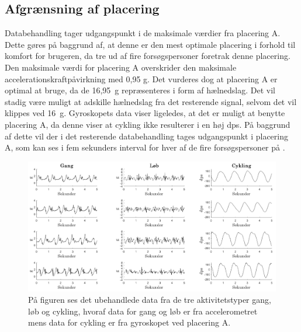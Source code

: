 \subsection{Afgrænsning af placering}
Databehandling tager udgangspunkt i de maksimale værdier fra placering A. Dette gøres på baggrund af, at denne er den mest optimale placering i forhold til komfort for brugeren, da tre ud af fire forsøgspersoner foretrak denne placering. Den maksimale værdi for placering A overskrider den maksimale accelerationskraftpåvirkning med 0,95 g. Det vurderes dog at placering A er optimal at bruge, da de 16,95~g repræsenteres i form af hælnedslag. Det vil stadig være muligt at adskille hælnedslag fra det resterende signal, selvom det vil klippes ved 16~g. \newline
Gyroskopets data viser ligeledes, at det er muligt at benytte placering A, da denne viser at cykling ikke resulterer i en høj dps. På baggrund af dette vil der i det resterende databehandling tages udgangspunkt i placering A, som kan ses i fem sekunders interval for hver af de fire forsøgspersoner på .
\begin{figure}[H]
	\centering
	\includegraphics[width=.85\textwidth]{figures/qBilag/raa_data}
	\caption{På figuren ses det ubehandlede data fra de tre aktivitetstyper gang, løb og cykling, hvoraf data for gang og løb er fra accelerometret mens data for cykling er fra gyroskopet ved placering A.}
	\label{raa_data}
\end{figure}\vspace{-.5cm}

